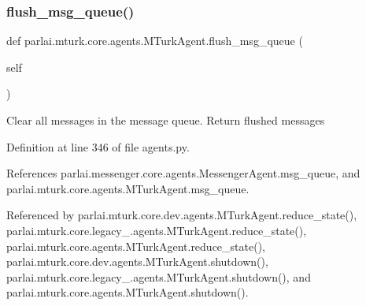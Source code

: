 \mbox{\label{classparlai_1_1mturk_1_1core_1_1agents_1_1MTurkAgent_a7e522f68c78685e18b602f7579acce9d}} 
\subsubsection{\texorpdfstring{flush\+\_\+msg\+\_\+queue()}{flush\_msg\_queue()}}
{\footnotesize\ttfamily def parlai.\+mturk.\+core.\+agents.\+M\+Turk\+Agent.\+flush\+\_\+msg\+\_\+queue (\begin{DoxyParamCaption}\item[{}]{self }\end{DoxyParamCaption})}

\begin{DoxyVerb}Clear all messages in the message queue. Return flushed messages\end{DoxyVerb}
 

Definition at line 346 of file agents.\+py.



References parlai.\+messenger.\+core.\+agents.\+Messenger\+Agent.\+msg\+\_\+queue, and parlai.\+mturk.\+core.\+agents.\+M\+Turk\+Agent.\+msg\+\_\+queue.



Referenced by parlai.\+mturk.\+core.\+dev.\+agents.\+M\+Turk\+Agent.\+reduce\+\_\+state(), parlai.\+mturk.\+core.\+legacy\+\_.\+agents.\+M\+Turk\+Agent.\+reduce\+\_\+state(), parlai.\+mturk.\+core.\+agents.\+M\+Turk\+Agent.\+reduce\+\_\+state(), parlai.\+mturk.\+core.\+dev.\+agents.\+M\+Turk\+Agent.\+shutdown(), parlai.\+mturk.\+core.\+legacy\+\_.\+agents.\+M\+Turk\+Agent.\+shutdown(), and parlai.\+mturk.\+core.\+agents.\+M\+Turk\+Agent.\+shutdown().

